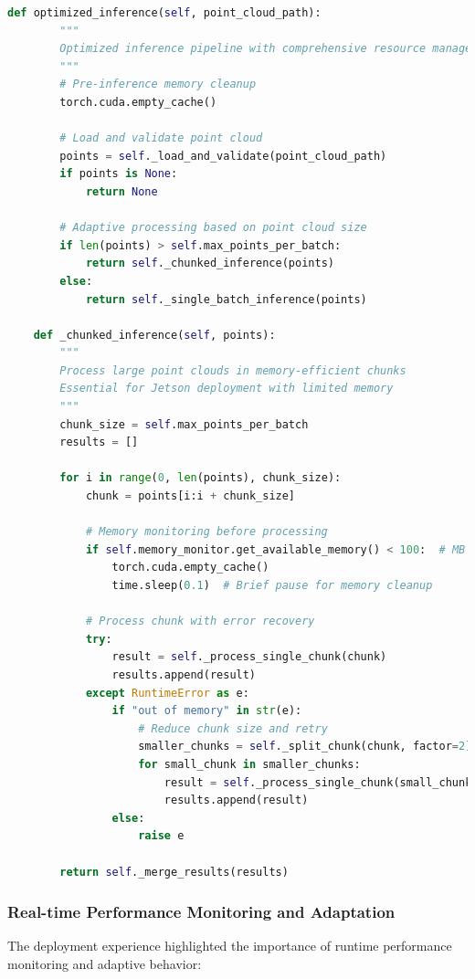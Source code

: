 \documentclass[12pt,a4paper]{report}
\begin{document}
\begin{lstlisting}[caption=Real-world Performance Optimization Strategies, label=lst:performance_optimization, language=python]
    def optimized_inference(self, point_cloud_path):
        """
        Optimized inference pipeline with comprehensive resource management
        """
        # Pre-inference memory cleanup
        torch.cuda.empty_cache()
        
        # Load and validate point cloud
        points = self._load_and_validate(point_cloud_path)
        if points is None:
            return None
        
        # Adaptive processing based on point cloud size
        if len(points) > self.max_points_per_batch:
            return self._chunked_inference(points)
        else:
            return self._single_batch_inference(points)
    
    def _chunked_inference(self, points):
        """
        Process large point clouds in memory-efficient chunks
        Essential for Jetson deployment with limited memory
        """
        chunk_size = self.max_points_per_batch
        results = []
        
        for i in range(0, len(points), chunk_size):
            chunk = points[i:i + chunk_size]
            
            # Memory monitoring before processing
            if self.memory_monitor.get_available_memory() < 100:  # MB
                torch.cuda.empty_cache()
                time.sleep(0.1)  # Brief pause for memory cleanup
            
            # Process chunk with error recovery
            try:
                result = self._process_single_chunk(chunk)
                results.append(result)
            except RuntimeError as e:
                if "out of memory" in str(e):
                    # Reduce chunk size and retry
                    smaller_chunks = self._split_chunk(chunk, factor=2)
                    for small_chunk in smaller_chunks:
                        result = self._process_single_chunk(small_chunk)
                        results.append(result)
                else:
                    raise e
        
        return self._merge_results(results)
\end{lstlisting}

\subsubsection{Real-time Performance Monitoring and Adaptation}

The deployment experience highlighted the importance of runtime performance monitoring and adaptive behavior:
\end{document}
